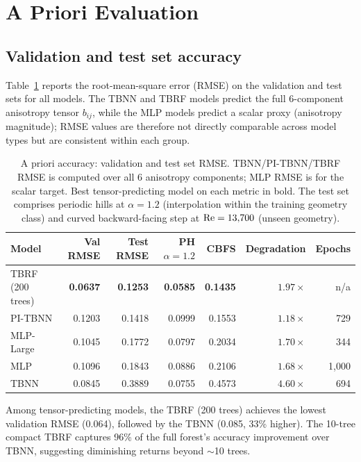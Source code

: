 \section{A Priori Evaluation}
\label{sec:apriori}

\subsection{Validation and test set accuracy}

Table~\ref{tab:apriori_rmse} reports the root-mean-square error (RMSE) on the validation and test sets for all models.
The TBNN and TBRF models predict the full $6$-component anisotropy tensor $b_{ij}$, while the MLP models predict a scalar proxy (anisotropy magnitude); RMSE values are therefore not directly comparable across model types but are consistent within each group.

\begin{table}[htbp]
\centering
\caption{A priori accuracy: validation and test set RMSE. TBNN/PI-TBNN/TBRF RMSE is computed over all 6 anisotropy components; MLP RMSE is for the scalar target. Best tensor-predicting model on each metric in bold. The test set comprises periodic hills at $\alpha=1.2$ (interpolation within the training geometry class) and curved backward-facing step at $\mathrm{Re}=13{,}700$ (unseen geometry).}
\label{tab:apriori_rmse}
\begin{tabular}{lrrrrrr}
\toprule
Model & Val RMSE & Test RMSE & PH $\alpha{=}1.2$ & CBFS & Degradation & Epochs \\
\midrule
TBRF (200 trees) & \textbf{0.0637} & \textbf{0.1253} & \textbf{0.0585} & \textbf{0.1435} & $1.97\times$ & n/a \\
PI-TBNN          & 0.1203          & 0.1418          & 0.0999          & 0.1553          & $1.18\times$ & 729 \\
MLP-Large        & 0.1045          & 0.1772          & 0.0797          & 0.2034          & $1.70\times$ & 344 \\
MLP              & 0.1096          & 0.1843          & 0.0886          & 0.2106          & $1.68\times$ & 1{,}000 \\
TBNN             & 0.0845          & 0.3889          & 0.0755          & 0.4573          & $4.60\times$ & 694 \\
\bottomrule
\end{tabular}
\end{table}

Among tensor-predicting models, the TBRF (200 trees) achieves the lowest validation RMSE (0.064), followed by the TBNN (0.085, 33\% higher).
The 10-tree compact TBRF captures 96\% of the full forest's accuracy improvement over TBNN, suggesting diminishing returns beyond $\sim$10 trees.

